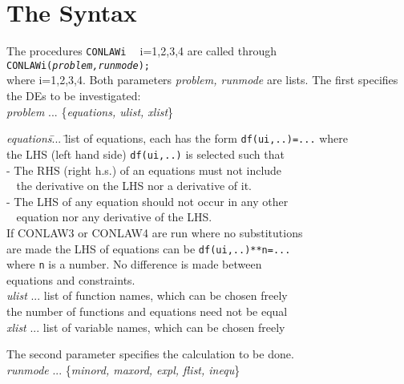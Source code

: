 \documentclass[12pt]{article}
\begin{document}
\section{The Syntax}
The procedures {\tt CONLAWi} $\;\;$ i=1,2,3,4 are called through \\
{\tt CONLAWi({\it problem,runmode}); } \\
where i=1,2,3,4. Both parameters {\it problem, runmode} are lists.
The first specifies the DEs to be investigated: \\
{\it problem} ... \{{\it equations, ulist, xlist}\}
\begin{tabbing}
\hspace{0.5cm}
 {\it equations}\= ... \= list of equations,
              each has the form {\tt df(ui,..)=...} where \\
       \>  \> the LHS (left hand side) {\tt df(ui,..)} is selected such that \\
       \>  \>  - The RHS (right h.s.) of an equations must not include     \\
       \>  \>$\;\;$ the derivative on the LHS nor a derivative of it.  \\
       \>  \>  - The LHS of any equation should not occur in any other\\
       \>  \>$\;\;$ equation nor any derivative of the LHS.  \\
       \>  \> If CONLAW3 or CONLAW4 are run where no substitutions\\
       \>  \> are made the LHS of equations can be {\tt df(ui,..)**n=...}\\
       \>  \> where {\tt n} is a number. No difference is made between\\
       \>  \> equations and constraints. \\
\hspace{0.5cm}
 {\it ulist} \>  ... \> list of function names, which can be chosen freely \\
             \>      \> the number of functions and equations need not
be equal \\
\hspace{0.5cm}
 {\it xlist}  \>  ... \> list of variable names, which can be chosen freely 
\end{tabbing}
The second parameter specifies the calculation to be done.  \\
{\it runmode} ... \{{\it minord, maxord, expl, flist, inequ}\}
\end{document}
